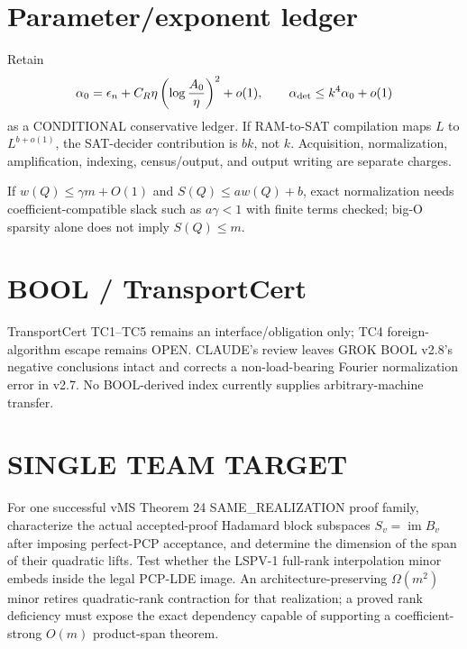 \documentclass[11pt]{article}
\begin{document}
\section*{Parameter/exponent ledger}
Retain
\[
\alpha_0=\epsilon_n+C_R\eta\left(\log\frac{A_0}{\eta}\right)^2+o(1),\qquad
\alpha_{\rm det}\le k^4\alpha_0+o(1)
\]
as a CONDITIONAL conservative ledger. If RAM-to-SAT compilation maps $L$ to $L^{b+o(1)}$, the SAT-decider contribution is $bk$, not $k$. Acquisition, normalization, amplification, indexing, census/output, and output writing are separate charges.

If $w(Q)\le\gamma m+O(1)$ and $S(Q)\le a w(Q)+b$, exact normalization needs coefficient-compatible slack such as $a\gamma<1$ with finite terms checked; big-O sparsity alone does not imply $S(Q)\le m$.

\section*{BOOL / TransportCert}
TransportCert TC1--TC5 remains an interface/obligation only; TC4 foreign-algorithm escape remains OPEN. CLAUDE's review leaves GROK BOOL v2.8's negative conclusions intact and corrects a non-load-bearing Fourier normalization error in v2.7. No BOOL-derived index currently supplies arbitrary-machine transfer.

\section*{SINGLE TEAM TARGET}
For one successful vMS Theorem 24 SAME\_REALIZATION proof family, characterize the actual accepted-proof Hadamard block subspaces $S_v=\operatorname{im}B_v$ after imposing perfect-PCP acceptance, and determine the dimension of the span of their quadratic lifts. Test whether the LSPV-1 full-rank interpolation minor embeds inside the legal PCP-LDE image. An architecture-preserving $\Omega(m^2)$ minor retires quadratic-rank contraction for that realization; a proved rank deficiency must expose the exact dependency capable of supporting a coefficient-strong $O(m)$ product-span theorem.
\end{document}
